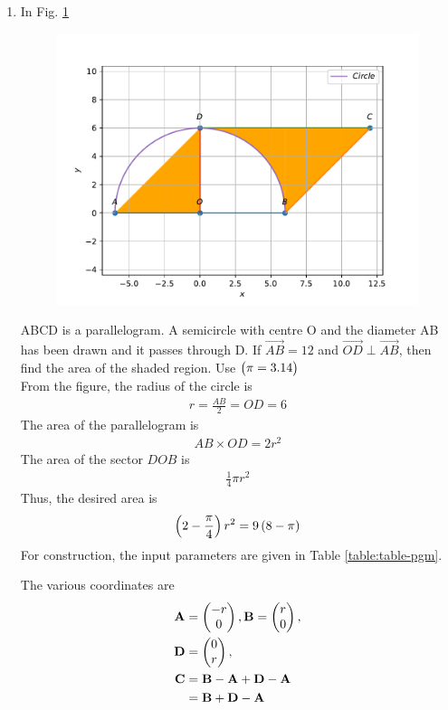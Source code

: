 \documentclass[journal,12pt,twocolumn]{IEEEtran}
\begin{document}
\begin{enumerate}
    \item In Fig. 
	  \ref{fig:matrix-10-17.pdf}
  \begin{figure}
	  \centering 
	  \includegraphics[width=\columnwidth]{figs/matrix-10-17.pdf}
	  \caption{}
	  \label{fig:matrix-10-17.pdf}
	  \end{figure}
	    ABCD is a parallelogram. A semicircle with centre O and the diameter AB has been drawn and it passes through D. If $\Vec{AB} = 12$ and $\Vec{OD} \perp \Vec{AB}$, then find the area of the shaded region. Use $\begin{pmatrix}\pi = 3.14\end{pmatrix}$\\
	    \solution From the figure, the radius of the circle is  
	    \begin{align}
		    r = \frac{AB}{2} = OD = 6
	    \end{align}
	    The area of the parallelogram is 
	    \begin{align}
		    AB \times OD = 2r^2 
	    \end{align}
	    The area of the sector $DOB$ is 
	    \begin{align}
		    \frac{1}{4}\pi r^2 
	    \end{align}
	    Thus, the desired area is 
	    \begin{align}
		    \left(2 -  \frac{\pi}{4}\right) r^2 = 9\left(8 - \pi\right)
	    \end{align}
     For construction, the input parameters are given in Table 
\ref{table:table-pgm}.	
\begin{table}[ht!]
	
\caption{}
\label{table:table-pgm}	
\end{table}
The various coordinates are 
\begin{align}
	\mathbf{A} &= \begin{pmatrix}-r \\ 0\end{pmatrix},
	\mathbf{B} = \begin{pmatrix}r \\ 0\end{pmatrix},
	\\
	\mathbf{D} &= \begin{pmatrix}0 \\ r\end{pmatrix},
	\\
	\mathbf{C} &= \mathbf{B}-\mathbf{A} + \mathbf{D}-\mathbf{A}
	\\
	&= \mathbf{B}+ \mathbf{D}-\mathbf{A}
\end{align}


\end{enumerate}
\end{document}
